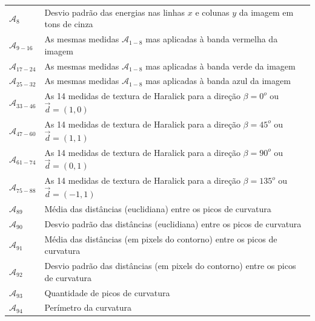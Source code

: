 \begin{table}
\begin{center}
\begin{tabular}{l|l}
    $\mathcal{A}_8$ &
    Desvio padrão das energias nas linhas $x$ e colunas $y$ da imagem em tons de
    cinza \\

    $\mathcal{A}_{9-16}$ &
    As mesmas medidas $\mathcal{A}_{1-8}$ mas aplicadas à banda vermelha da
    imagem \\

    $\mathcal{A}_{17-24}$ &
    As mesmas medidas $\mathcal{A}_{1-8}$ mas aplicadas à banda verde da
    imagem \\

    $\mathcal{A}_{25-32}$ &
    As mesmas medidas $\mathcal{A}_{1-8}$ mas aplicadas à banda azul da
    imagem \\

    $\mathcal{A}_{33-46}$ &
    As 14 medidas de textura de Haralick para a direção $\beta = 0^o$ ou $\vec{d} = (1, 0)$ \\

$\mathcal{A}_{47-60}$ &
    As 14 medidas de textura de Haralick para a direção $\beta = 45^o$ ou $\vec{d} = (1, 1)$ \\

$\mathcal{A}_{61-74}$ &
    As 14 medidas de textura de Haralick para a direção $\beta = 90^o$ ou $\vec{d} = (0, 1)$ \\

$\mathcal{A}_{75-88}$ &
    As 14 medidas de textura de Haralick para a direção $\beta = 135^o$ ou $\vec{d} = (-1, 1)$ \\

    $\mathcal{A}_{89}$ &
    Média das distâncias (euclidiana) entre os picos de curvatura \\

    $\mathcal{A}_{90}$ &
    Desvio padrão das distâncias (euclidiana) entre os picos de curvatura \\

    $\mathcal{A}_{91}$ &
    Média das distâncias (em pixels do contorno) entre os picos de curvatura \\

    $\mathcal{A}_{92}$ &
    Desvio padrão das distâncias (em pixels do contorno) entre os picos de
    curvatura \\

    $\mathcal{A}_{93}$ &
    Quantidade de picos de curvatura \\

    $\mathcal{A}_{94}$ &
    Perímetro da curvatura \\


\end{tabular}
\end{center}
\end{table}
